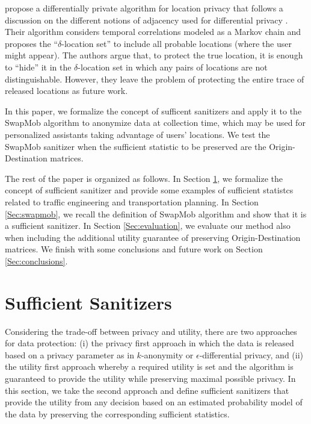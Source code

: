 \documentclass[times,twocolumn,final,authoryear]{elsarticle}
\begin{document}


\cite{Xiao:2015} propose a differentially private algorithm for location privacy that follows a discussion on the different notions of adjacency used for  differential privacy \citep[for e.g.]{Chatzik:2013,Kifer:2011}.
Their algorithm considers temporal correlations modeled as a Markov chain and proposes the ``$\delta$-location set'' to include all probable locations (where the user might appear). The authors argue that, to protect the true location, it is enough to “hide” it in the $\delta$-location set in which any pairs of locations are not distinguishable.
However, they leave the problem of protecting the entire trace of released locations as future work.


In this paper, we formalize the concept of sufficent sanitizers and apply it to the SwapMob algorithm to anonymize data at collection time, which may be used for personalized assistants taking advantage of users' locations.
We test the SwapMob sanitizer when the sufficient statistic to be preserved are the Origin-Destination matrices.

  
The rest of the paper is organized as follows. In Section \ref{Sec:SufficientSanitizer}, we formalize the concept of sufficient sanitizer and provide some examples of sufficient statistcs related to traffic engineering and transportation planning. 
In Section \ref{Sec:swapmob}, 
we recall the definition of SwapMob algorithm and show that it is a sufficient sanitizer.
In Section \ref{Sec:evaluation}, we evaluate our method also when including the additional utility guarantee of preserving Origin-Destination matrices. 
We finish with some conclusions and future work on Section \ref{Sec:conclusions}.

\section{Sufficient Sanitizers}\label{Sec:SufficientSanitizer}

Considering the trade-off between privacy and utility, there are two approaches for data protection: 
(i) the privacy first approach in which the data is released based on a privacy parameter as in $k$-anonymity or $\epsilon$-differential privacy, and (ii) the utility first approach whereby a required utility is set and the algorithm is guaranteed to provide the utility while preserving maximal possible privacy.
In this section, we take the second approach and define sufficient sanitizers that provide the utility from any decision based on an estimated probability model of the data by preserving the corresponding sufficient statistics.
\end{document}
